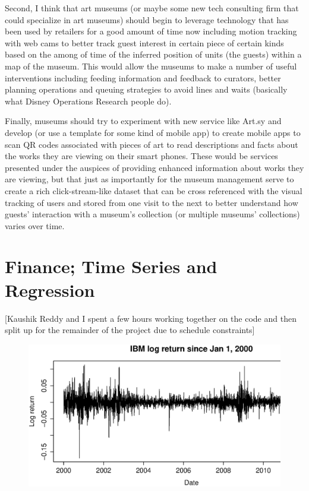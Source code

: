 \documentclass{article}
\begin{document}
Second, I think that art museums (or maybe some new tech consulting firm that could specialize in art museums) should begin to leverage technology that has been used by retailers for a good amount of time now including motion tracking with web cams to better track guest interest in certain piece of certain kinds based on the among of time of the inferred position of units (the guests) within a map of the museum.  This would allow the museums to make a number of useful interventions including feeding information and feedback to curators, better planning operations and queuing strategies to avoid lines and waits (basically what Disney Operations Research people do).

Finally, museums should try to experiment with new service like Art.sy and develop (or use a template for some kind of mobile app) to create mobile apps to scan QR codes associated with pieces of art to read descriptions and facts about the works they are viewing on their smart phones.  These would be services presented under the auspices of providing enhanced information about works they are viewing, but that just as importantly for the museum management serve to create a rich click-stream-like dataset that can be cross referenced with the visual tracking of users and stored from one visit to the next to better understand how guests’ interaction with a museum’s collection (or multiple museums’ collections) varies over time.


\section{Finance; Time Series and Regression}
[Kaushik Reddy and I spent a few hours working together on the code and then split up for the remainder of the project due to schedule constraints]

\begin{figure}[H]
\begin{center}
\includegraphics[width=1\columnwidth]{IBM_log_return.eps}
\caption{}
\end{center}
\end{figure}
\end{document}
